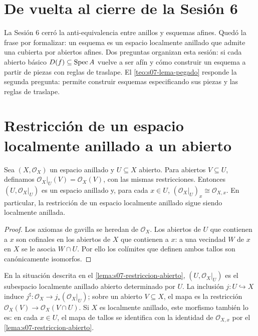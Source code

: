 \section{De vuelta al cierre de la Sesión 6}

La Sesión 6 cerró la anti-equivalencia entre anillos y esquemas afines. Quedó la frase por formalizar: un esquema es un espacio localmente anillado que admite una cubierta por abiertos afines. Dos preguntas organizan esta sesión: si cada abierto básico $D(f)\subseteq\operatorname{Spec} A$ vuelve a ser afín y cómo construir un esquema a partir de piezas con reglas de traslape. El \cref{teo:s07-lema-pegado} responde la segunda pregunta: permite construir esquemas especificando sus piezas y las reglas de traslape.

\section{Restricción de un espacio localmente anillado a un abierto}

\begin{lema}
\label{lema:s07-restriccion-abierto}
Sea $(X,\mathcal O_X)$ un espacio anillado y $U\subseteq X$ abierto. Para abiertos $V\subseteq U$, definamos $\mathcal O_X|_U(V)=\mathcal O_X(V)$, con las mismas restricciones. Entonces $(U,\mathcal O_X|_U)$ es un espacio anillado y, para cada $x\in U$, $ (\mathcal O_X|_U)_x\cong\mathcal O_{X,x}$. En particular, la restricción de un espacio localmente anillado sigue siendo localmente anillada.
\end{lema}
\begin{proof}
Los axiomas de gavilla se heredan de $\mathcal O_X$. Los abiertos de $U$ que contienen a $x$ son cofinales en los abiertos de $X$ que contienen a $x$: a una vecindad $W$ de $x$ en $X$ se le asocia $W\cap U$. Por ello los colímites que definen ambos tallos son canónicamente isomorfos.
\end{proof}

\begin{defi}
\label{defi:s07-subespacio-localmente-anillado-abierto}
En la situación descrita en el \cref{lema:s07-restriccion-abierto}, $(U,\mathcal O_X|_U)$ es el subespacio localmente anillado abierto determinado por $U$. La inclusión $j\colon U\hookrightarrow X$ induce $j^\sharp\colon \mathcal O_X\to j_*(\mathcal O_X|_U)$; sobre un abierto $V\subseteq X$, el mapa es la restricción $\mathcal O_X(V)\to\mathcal O_X(V\cap U)$. Si $X$ es localmente anillado, este morfismo también lo es: en cada $x\in U$, el mapa de tallos se identifica con la identidad de $\mathcal O_{X,x}$ por el \cref{lema:s07-restriccion-abierto}.
\end{defi}

